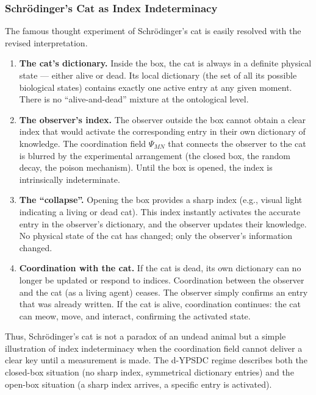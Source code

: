 \documentclass[12pt,a4paper]{article}
\theoremstyle{remark}
\begin{document}
	
	\subsubsection{Schr\"odinger's Cat as Index Indeterminacy}
	
	The famous thought experiment of Schr\"odinger's cat is easily resolved
	with the revised interpretation.
	
	\begin{enumerate}[leftmargin=*]
		\item \textbf{The cat's dictionary.} Inside the box, the cat is
		always in a definite physical state --- either alive or dead.
		Its local dictionary (the set of all its possible biological
		states) contains exactly one active entry at any given
		moment.  There is no ``alive-and-dead'' mixture at the
		ontological level.
		
		\item \textbf{The observer's index.} The observer outside the box
		cannot obtain a clear index that would activate the
		corresponding entry in their own dictionary of knowledge.
		The coordination field $\Psi_{MN}$ that connects the
		observer to the cat is blurred by the experimental
		arrangement (the closed box, the random decay, the poison
		mechanism).  Until the box is opened, the index is
		intrinsically indeterminate.
		
		\item \textbf{The ``collapse''.} Opening the box provides a sharp
		index (e.g., visual light indicating a living or dead cat).
		This index instantly activates the accurate entry in the
		observer's dictionary, and the observer updates their
		knowledge.  No physical state of the cat has changed; only
		the observer's information changed.
		
		\item \textbf{Coordination with the cat.} If the cat is dead, its
		own dictionary can no longer be updated or respond to
		indices.  Coordination between the observer and the cat (as
		a living agent) ceases.  The observer simply confirms an
		entry that was already written.  If the cat is alive,
		coordination continues: the cat can meow, move, and
		interact, confirming the activated state.
	\end{enumerate}
	
	Thus, Schr\"odinger's cat is not a paradox of an undead animal but a
	simple illustration of index indeterminacy when the coordination
	field cannot deliver a clear key until a measurement is made.  The
	d-YPSDC regime describes both the closed-box situation (no sharp
	index, symmetrical dictionary entries) and the open-box situation
	(a sharp index arrives, a specific entry is activated).
	
\end{document}
